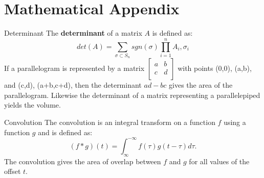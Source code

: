 \documentclass[xcolor=dvipsnames]{beamer}
\begin{document}
\section{Mathematical Appendix}


\begin{frame}[label=math-determinant]{Determinant}
The \textbf{determinant} of a matrix $A$ is defined as:
 \begin{equation}
  det(A) = \sum_{\sigma \subset S_n} sgn(\sigma)
           \prod_{i=1}^{n} A_i,\sigma_i
 \end{equation}
If a parallelogram is represented by a matrix 
$
 \begin{bmatrix}
   a &
   b \\
   c &
   d \\
 \end{bmatrix}
$
with points (0,0), (a,b), and (c,d), (a+b,c+d), then the determinant $ad-bc$ gives the area of the parallelogram. Likewise the determinant of a matrix representing a parallelepiped yields the volume. 
\end{frame}

\begin{frame}[label=math-convolution]{Convolution}
 The convolution is an integral transform on a function $f$ using a function $g$ and is defined as:
 \begin{equation}
  (f*g)(t) = \int_{\infty}^{-\infty} f(\tau) g(t-\tau) d\tau.
 \end{equation}
 The convolution gives the area of overlap between $f$ and $g$ for all values of the offset $t$.
\end{frame}
\end{document}

